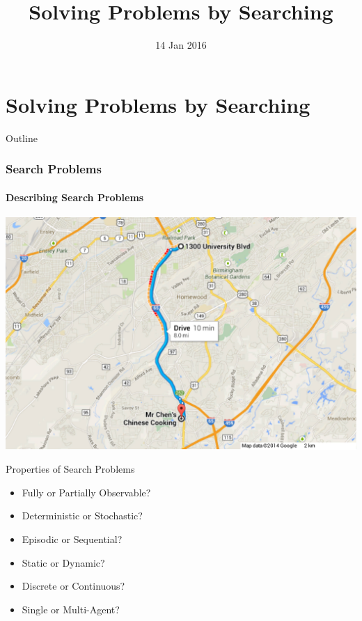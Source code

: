 \documentclass[14pt]{beamer}
\title{Solving Problems by Searching}
\date[]{14 Jan 2016}
\begin{document}
\begin{frame}
  \titlepage
\end{frame}

\part{Solving Problems by Searching}

\begin{frame}{Outline}
\tableofcontents
\end{frame}

\section{Search Problems}

\subsection{Describing Search Problems}
\begin{frame}[plain]
\begin{center}
\includegraphics[width=\textwidth]{uab-to-mr-chens.pdf}
\end{center}
\end{frame}

\begin{frame}{Properties of Search Problems}
\begin{itemize}
\item \alert<2->{Fully} or Partially Observable?
\item \alert<3->{Deterministic} or Stochastic?
\item Episodic or \alert<4->{Sequential}?
\item \alert<5->{Static} or Dynamic?
\item \alert<6->{Discrete} or Continuous?
\item \alert<7->{Single} or Multi-Agent?
\end{itemize}
\end{frame}
\end{document}
